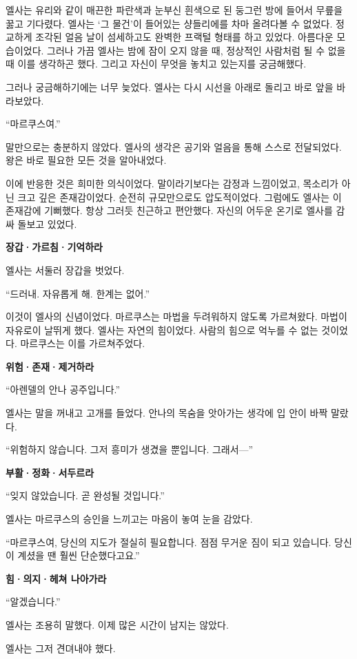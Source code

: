 엘사는 유리와 같이 매끈한 파란색과 눈부신 흰색으로 된 둥그런 방에 들어서 무릎을 꿇고 기다렸다. 엘사는 `그 물건'이 들어있는 샹들리에를 차마 올려다볼 수 없었다. 정교하게 조각된 얼음 날이 섬세하고도 완벽한 프랙털 형태를 하고 있었다. 아름다운 모습이었다. 그러나 가끔 엘사는 밤에 잠이 오지 않을 때, 정상적인 사람처럼 될 수 없을때 이를 생각하곤 했다. 그리고 자신이 무엇을 놓치고 있는지를 궁금해했다.

그러나 궁금해하기에는 너무 늦었다. 엘사는 다시 시선을 아래로 돌리고 바로 앞을 바라보았다.

``마르쿠스여.''

말만으로는 충분하지 않았다. 엘사의 생각은 공기와 얼음을 통해 스스로 전달되었다. 왕은 바로 필요한 모든 것을 알아내었다.

이에 반응한 것은 희미한 의식이었다. 말이라기보다는 감정과 느낌이었고, 목소리가 아닌 크고 깊은 존재감이었다. 순전히 규모만으로도 압도적이었다. 그럼에도 엘사는 이 존재감에 기뻐했다. 항상 그러듯 친근하고 편안했다. 자신의 어두운 온기로 엘사를 감싸 돌보고 있었다.

\textbf{장갑·가르침·기억하라}

엘사는 서둘러 장갑을 벗었다.

``드러내. 자유롭게 해. 한계는 없어.''

이것이 엘사의 신념이었다. 마르쿠스는 마법을 두려워하지 않도록 가르쳐왔다. 마법이 자유로이 날뛰게 했다. 엘사는 자연의 힘이었다. 사람의 힘으로 억누를 수 없는 것이었다. 마르쿠스는 이를 가르쳐주었다.

\textbf{위험·존재·제거하라}

``아렌델의 안나 공주입니다.''

엘사는 말을 꺼내고 고개를 들었다. 안나의 목숨을 앗아가는 생각에 입 안이 바짝 말랐다.

``위험하지 않습니다. 그저 흥미가 생겼을 뿐입니다. 그래서—''

\textbf{부활·정화·서두르라}

``잊지 않았습니다. 곧 완성될 것입니다.''

엘사는 마르쿠스의 승인을 느끼고는 마음이 놓여 눈을 감았다.

``마르쿠스여, 당신의 지도가 절실히 필요합니다. 점점 무거운 짐이 되고 있습니다. 당신이 계셨을 땐 훨씬 단순했다고요.''

\textbf{힘·의지·헤쳐 나아가라}

``알겠습니다.''

엘사는 조용히 말했다. 이제 많은 시간이 남지는 않았다.

엘사는 그저 견뎌내야 했다.

